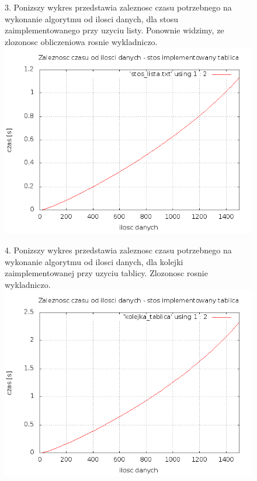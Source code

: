 \documentclass[a4paper,11pt]{report}
\begin{document}
\begin{figure}
  3. Ponizszy wykres przedstawia zaleznosc czasu potrzebnego na wykonanie algorytmu od ilosci danych, dla stosu zaimplementowanego przy uzyciu listy. Ponownie widzimy, ze zlozonosc obliczeniowa rosnie wykladniczo.
    \includegraphics[scale=0.5]{./s_stos_lista.png}
\end{figure}

\begin{figure}
  4. Ponizszy wykres przedstawia zaleznosc czasu potrzebnego na wykonanie algorytmu od ilosci danych, dla kolejki zaimplementowanej przy uzyciu tablicy. Zlozonosc rosnie wykladniczo.
    \includegraphics[scale=0.5]{./s_kolejka_tablica.png}
\end{figure}
\end{document}
